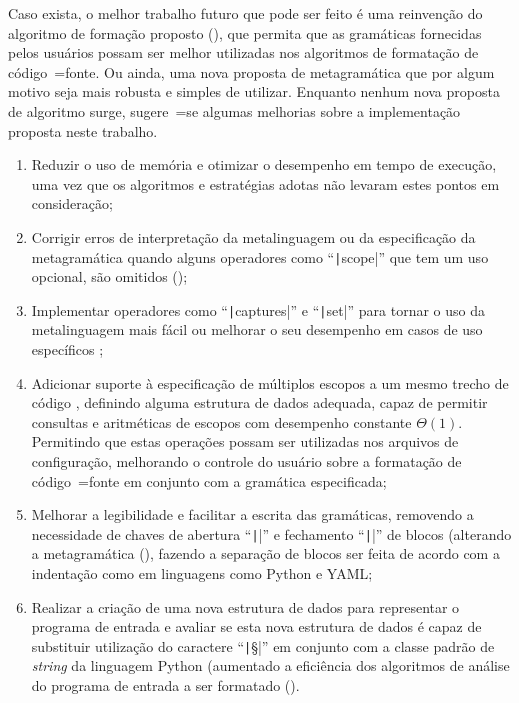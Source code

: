 Caso exista,
o melhor trabalho futuro que pode ser feito é uma reinvenção do algoritmo de formação proposto (),
que permita que as gramáticas fornecidas pelos usuários possam ser melhor utilizadas nos algoritmos de formatação de código~=fonte.
Ou ainda,
uma nova proposta de metagramática que por algum motivo seja mais robusta e
simples de utilizar.
Enquanto nenhum nova proposta de algoritmo surge,
sugere~=se algumas melhorias sobre a implementação proposta neste trabalho.
\begin{enumerate}
\item Reduzir o uso de memória e
otimizar o desempenho em tempo de execução,
uma vez que os algoritmos e
estratégias adotas não levaram estes pontos em consideração;
\item Corrigir erros de interpretação da metalinguagem ou
da especificação da metagramática quando alguns operadores como ``\texttt|scope|'' que tem um uso opcional,
são omitidos ();
\item Implementar operadores como ``\texttt|captures|'' e
``\texttt|set|'' para tornar o uso da metalinguagem mais fácil ou
melhorar o seu desempenho em casos de uso específicos \cite{sublimeTextSyntax};
\item Adicionar suporte à especificação de múltiplos escopos a um mesmo trecho de código \cite{vsCodeSyntaxHighlighthing},
definindo alguma estrutura de dados adequada,
capaz de permitir consultas e
aritméticas de escopos \cite{textMateScopeExclusion} com desempenho constante $\Theta(1)$.
Permitindo que estas operações possam ser utilizadas nos arquivos de configuração,
melhorando o controle do usuário sobre a formatação de código~=fonte em conjunto com a gramática especificada;
\item Melhorar a legibilidade e
facilitar a escrita das gramáticas,
removendo a necessidade de chaves de abertura ``\texttt|{|'' e
fechamento ``\texttt|}|'' de blocos (alterando a metagramática (),
fazendo a separação de blocos ser feita de acordo com a indentação como em linguagens como Python e
YAML;
\item Realizar a criação de uma nova estrutura de dados para representar o programa de entrada e
avaliar se esta nova estrutura de dados é capaz de substituir utilização do caractere ``\texttt|§|'' em conjunto com a classe padrão de \textit{string} da linguagem Python (aumentado a eficiência dos algoritmos de análise do programa de entrada a ser formatado ().

\end{enumerate}
